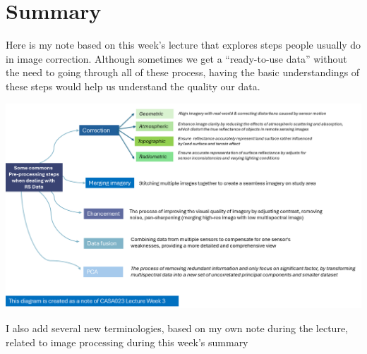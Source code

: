 \documentclass[
  letterpaper,
  DIV=11,
  numbers=noendperiod]{scrreprt}
\begin{document}
\hypertarget{summary-2}{%
\section{Summary}\label{summary-2}}

Here is my note based on this week's lecture that explores steps people
usually do in image correction. Although sometimes we get a
``ready-to-use data'' without the need to going through all of these
process, having the basic understandings of these steps would help us
understand the quality our data.

\includegraphics{images/clipboard-3039716080.png}

I also add several new terminologies, based on my own note during the
lecture, related to image processing during this week's summary
\end{document}
